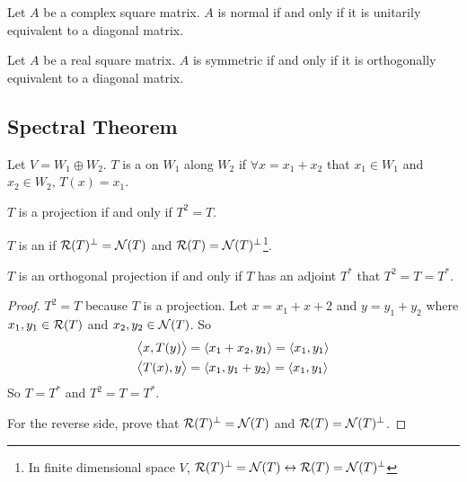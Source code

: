 \begin{theorem}
    Let $A$ be a complex square matrix. $A$ is normal if and only if it is unitarily equivalent to a diagonal matrix.    
\end{theorem}

\begin{theorem}
    Let $A$ be a real square matrix. $A$ is symmetric if and only if it is orthogonally equivalent to a diagonal matrix.    
\end{theorem}





\subsection{Spectral Theorem}

\begin{definition}
    Let $V = W_1 \oplus W_2$. $T$ is a  on $W_1$ along $W_2$ if $\forall x = x_1 + x_2$ that $x_1 \in W_1$ and $x_2 \in W_2$, $T(x) = x_1$.
\end{definition}

\begin{theorem}
    $T$ is a projection if and only if $T^2 = T$.
\end{theorem}

\begin{definition}
    $T$ is an  if $\mathcal{R}(T)^\bot = \mathcal{N}(T)$ and $\mathcal{R}(T)= \mathcal{N}(T)^\bot$\footnote{In finite dimensional space $V$, $\mathcal{R}(T)^\bot = \mathcal{N}(T) \leftrightarrow \mathcal{R}(T)= \mathcal{N}(T)^\bot$}. 
\end{definition}



\begin{theorem}
    $T$ is an orthogonal projection if and only if $T$ has an adjoint $T^*$ that $T^2 = T = T^*$.
\end{theorem}
\begin{proof}
    $T^2 = T$ because $T$ is a projection. Let $x=x_1+x+2$ and $y=y_1+y_2$ where $x_1,y_1 \in \mathcal{R}(T)$ and $x_2,y_2 \in \mathcal{N}(T)$. So
    \begin{equation*}
        \begin{aligned}
            \left\langle \displaystyle x, T(y) \right\rangle &= \left\langle \displaystyle x_1 + x_2, y_1 \right\rangle = \left\langle \displaystyle x_1, y_1 \right\rangle \\
            \left\langle \displaystyle T(x), y \right\rangle &= \left\langle \displaystyle x_1, y_1 + y_2 \right\rangle = \left\langle \displaystyle x_1, y_1 \right\rangle
        \end{aligned}
    \end{equation*}
    So $T = T^*$ and $T^2 = T = T^*$.
    
    For the reverse side, prove that $\mathcal{R}(T)^\bot = \mathcal{N}(T)$ and $\mathcal{R}(T)= \mathcal{N}(T)^\bot$.
\end{proof}

